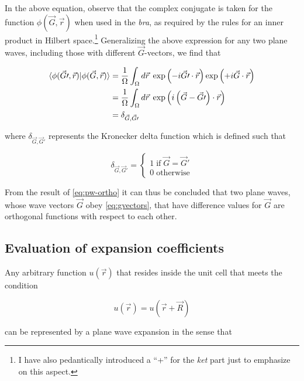 In the above equation, observe that the complex conjugate is taken for the function $\phi(\vec{G},\vec{r})$ when used in the \textit{bra}, as required by the rules for an inner product in Hilbert space.\footnote{I have also pedantically introduced a ``+'' for the \textit{ket} part just to emphasize on this aspect.} Generalizing the above expression for any two plane waves, including those with different $\vec{G}$-vectors, we find that

\begin{align}
    \braket{\phi(\vec{G}\prime,\vec{r}) | \phi(\vec{G},\vec{r})} &= \frac{1}{\Omega} \int_{\Omega} d \vec{r} \; \exp\left(-i \vec{G}\prime \cdot \vec{r} \right) \exp\left(+i \vec{G} \cdot \vec{r} \right) \\
    &= \frac{1}{\Omega} \int_{\Omega} d \vec{r} \; \exp\left(i \left(\vec{G} - \vec{G}\prime \right) \cdot \vec{r} \right) \\
    &= \delta_{\vec{G},\vec{G}\prime} \label{eq:pw-ortho}
\end{align}

where $\delta_{\vec{G},\vec{G}\prime}$ represents the Kronecker delta function which is defined such that

\begin{equation}
    \delta_{\vec{G},\vec{G}\prime} =
    \begin{cases}
    1\; \text{if}\; \vec{G} = \vec{G}\prime \\
    0\; \text{otherwise}
    \end{cases}
\end{equation}

From the result of \cref{eq:pw-ortho} it can thus be concluded that two plane waves, whose wave vectors $\vec{G}$ obey \cref{eq:gvectors}, that have difference values for $\vec{G}$ are orthogonal functions with respect to each other.

%
%
%
\subsection{Evaluation of expansion coefficients}

Any arbitrary function $u(\vec{r})$ that resides inside the unit cell that meets the condition

\begin{equation}
    u(\vec{r}) = u(\vec{r} + \vec{R}) \label{eq:perfunc}
\end{equation}

can be represented by a plane wave expansion in the sense that

